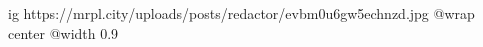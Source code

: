  
 
 
 
 

\ifcmt
  ig https://mrpl.city/uploads/posts/redactor/evbm0u6gw5echnzd.jpg
  @wrap center
  @width 0.9
\fi
